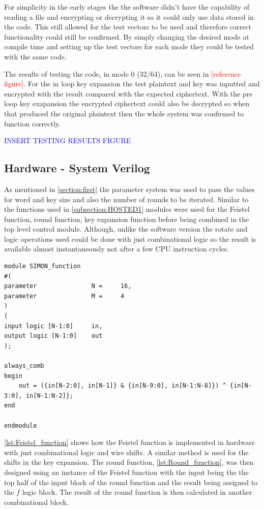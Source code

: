 \documentclass[12pt,twoside,a4paper]{report}
\begin{document}
	For simplicity in the early stages the the software didn't have the capability of reading a file and encrypting or decrypting it so it could only use data stored in the code. This still allowed for the test vectors to be used and therefore correct functionality could still be confirmed.  By simply changing the desired mode at compile time and setting up the test vectors for each mode they could be tested with the same code.
	
	The results of testing the code, in mode 0 (32/64), can be seen in \textcolor{red}{[reference figure]}. For the in loop key expansion the test plaintext and key was inputted and encrypted with the result compared with the expected ciphertext. With the pre loop key exapansion the encrypted ciphertext could also be decrypted so when that produced the original plaintext then the whole system was confirmed to function correctly.
	
	\textcolor{blue}{INSERT TESTING RESULTS FIGURE}
    
	\subsection{Hardware - System Verilog}
	\label{subsection:SV1}
	As mentioned in \autoref{section:first} the parameter system was used to pass the values for word and key size and also the number of rounds to be iterated. Similar to the functions used in \autoref{subsection:HOSTED1} modules were used for the Feistel function, round function, key expansion function before being combined in the top level control module. Although, unlike the software version the rotate and logic operations used could be done with just combinational logic so the result is available almost instantaneously not after a few CPU instruction cycles. 

	\begin{minipage}{\linewidth}
	\begin{lstlisting}[label={lst:Feistel_function},caption={The feistel function},style=SVStyle]	
module SIMON_function
#(
parameter 				N = 	16,
parameter 				M =		4
)
(
input logic [N-1:0]		in,
output logic [N-1:0]	out
);

always_comb
begin
	out = ({in[N-2:0], in[N-1]} & {in[N-9:0], in[N-1:N-8]}) ^ {in[N-3:0], in[N-1:N-2]};
end

endmodule
	\end{lstlisting}
	\end{minipage}
	
	\autoref{lst:Feistel_function} shows how the Feistel function is implemented in hardware with just combinational logic and wire shifts.  A similar method is used for the shifts in the key expansion. The round function, \autoref{lst:Round_function}, was then designed using an instance of the Feistel function with the input being the the top half of the input block of the round function and the result being assigned to the $f$ logic block. The result of the round function is then calculated in another combinational block.
\end{document}
